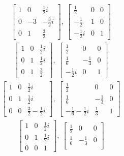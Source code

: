\documentclass[12pt]{article}
\begin{document}
\begin{enumerate}
\begin{align*}
\begin{bmatrix}
        1 & 0 & \frac{1}{2}i\\
        0 & -3 & -\frac{3}{2}i\\
        0 & 1 & \frac{3}{2}
      \end{bmatrix},\
      \begin{bmatrix}
        \frac{1}{2} & 0 & 0\\
        -\frac{1}{2} & 1 & 0\\
        -\frac{1}{2}i & 0 & 1
      \end{bmatrix}
    \end{align*}
    \begin{align*}
      \begin{bmatrix}
        1 & 0 & \frac{1}{2}i\\
        0 & 1 & \frac{1}{2}i\\
        0 & 1 & \frac{3}{2}
      \end{bmatrix},\
      \begin{bmatrix}
        \frac{1}{2} & 0 & 0\\
        \frac{1}{6} & -\frac{1}{3} & 0\\
        -\frac{1}{2}i & 0 & 1
      \end{bmatrix}
    \end{align*}
    \begin{align*}
      \begin{bmatrix}
        1 & 0 & \frac{1}{2}i\\
        0 & 1 & \frac{1}{2}i\\
        0 & 0 & \frac{3}{2}-\frac{1}{2}i
      \end{bmatrix},\
      \begin{bmatrix}
        \frac{1}{2} & 0 & 0\\
        \frac{1}{6} & -\frac{1}{3} & 0\\
        -\frac{1}{6}-\frac{1}{2}i & \frac{1}{3} & 1
      \end{bmatrix}
    \end{align*}
    \begin{align*}
      \begin{bmatrix}
        1 & 0 & \frac{1}{2}i\\
        0 & 1 & \frac{1}{2}i\\
        0 & 0 & 1
      \end{bmatrix},\
      \begin{bmatrix}
        \frac{1}{2} & 0 & 0\\
        \frac{1}{6} & -\frac{1}{3} & 0\\

\end{bmatrix}
\end{align*}
\end{enumerate}
\end{document}
